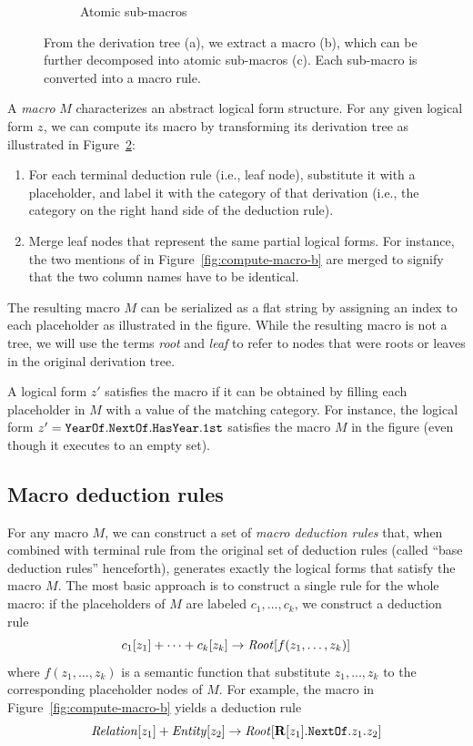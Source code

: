 \begin{figure}
\begin{subfigure}[b]{0.40\textwidth}
\caption{Atomic sub-macros}
\label{fig:compute-macro-c}
\end{subfigure}
\caption[
Derivation of macro deduction rules.
]{From the derivation tree (a), we extract a
macro (b), which can be further decomposed into
atomic sub-macros (c). Each sub-macro is converted
into a macro rule.}
\label{fig:compute-macro}
\end{figure}

A \emph{macro} $M$
characterizes an abstract logical form structure.
For any given logical form $z$,
we can compute its macro by transforming its derivation tree
as illustrated in Figure~\ref{fig:compute-macro}:
\begin{enumerate}
\item
For each terminal deduction rule (i.e., leaf node),
substitute it with a placeholder,
and label it with the category of that derivation
(i.e., the category on the right hand side of the
deduction rule).
\item
Merge leaf nodes that represent the same
partial logical forms.
For instance, the two mentions of 
in Figure~\ref{fig:compute-macro-b}
are merged to signify that the two column names
have to be identical.
\end{enumerate}

The resulting macro $M$ can be serialized as a flat string
by assigning an index to each placeholder
as illustrated in the figure.
While the resulting macro is not a tree,
we will use the terms \emph{root} and \emph{leaf}
to refer to nodes that were roots or leaves
in the original derivation tree.

A logical form $z'$ satisfies the macro
if it can be obtained by filling each placeholder in $M$
with a value of the matching category.
For instance,
the logical form
$z' = {\texttt{Year}}\texttt{Of}.{\texttt{Next}}\texttt{Of}.\texttt{Has}{\texttt{Year}}.\texttt{1st}$
satisfies the macro $M$ in the figure
(even though it executes to an empty set).

\subsection{Macro deduction rules}
For any macro $M$, we can construct a set of
\emph{macro deduction rules} that,
when combined with terminal rule from the 
original set of deduction rules
(called ``base deduction rules'' henceforth),
generates exactly the logical forms that satisfy
the macro $M$.
The most basic approach is to construct a single rule
for the whole macro:
if the placeholders of $M$ are labeled $c_1, \dots, c_k$,
we construct a deduction rule
\begin{equation}
c_1[z_1] + \dots + c_k[z_k] \to
\text{\emph{Root}}[f(z_1, \dots, z_k)]
\end{equation}
where $f(z_1, \dots, z_k)$
is a semantic function that substitute $z_1, \dots, z_k$
to the corresponding placeholder nodes of $M$.
For example, the macro in Figure~\ref{fig:compute-macro-b}
yields a deduction rule
\begin{equation}
\text{\emph{Relation}}[z_1] + \text{\emph{Entity}}[z_2] \to
\text{\emph{Root}}[\mathbf{R}[z_1].{\texttt{Next}}\texttt{Of}.z_1.z_2]
\end{equation}

